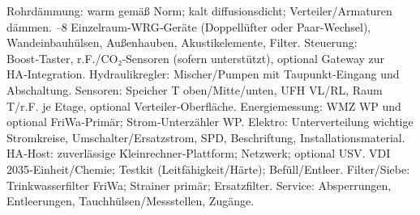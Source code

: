 \markdownRendererUlItem Rohrdämmung: warm gemäß Norm; kalt diffusionsdicht; Verteiler/Armaturen dämmen.\markdownRendererUlItemEnd 
\markdownRendererUlEndTight \markdownRendererInterblockSeparator
{}
\markdownRendererSectionEnd \markdownRendererSectionBegin
{}\markdownRendererInterblockSeparator
{}\markdownRendererUlBeginTight
{}–8 Einzelraum‑WRG‑Geräte (Doppellüfter oder Paar‑Wechsel), Wandeinbauhülsen, Außenhauben, Akustikelemente, Filter.\markdownRendererUlItemEnd 
\markdownRendererUlItem Steuerung: Boost‑Taster, r.F./CO₂‑Sensoren (sofern unterstützt), optional Gateway zur HA‑Integration.\markdownRendererUlItemEnd 
\markdownRendererUlEndTight \markdownRendererInterblockSeparator
{}
\markdownRendererSectionEnd \markdownRendererSectionBegin
{}\markdownRendererInterblockSeparator
{}\markdownRendererUlBeginTight
\markdownRendererUlItem Hydraulikregler: Mischer/Pumpen mit Taupunkt‑Eingang und Abschaltung.\markdownRendererUlItemEnd 
\markdownRendererUlItem Sensoren: Speicher T oben/Mitte/unten, UFH VL/RL, Raum T/r.F. je Etage, optional Verteiler‑Oberfläche.\markdownRendererUlItemEnd 
\markdownRendererUlItem Energiemessung: WMZ WP und optional FriWa‑Primär; Strom‑Unterzähler WP.\markdownRendererUlItemEnd 
\markdownRendererUlItem Elektro: Unterverteilung wichtige Stromkreise, Umschalter/Ersatzstrom, SPD, Beschriftung, Installationsmaterial.\markdownRendererUlItemEnd 
\markdownRendererUlItem HA‑Host: zuverlässige Kleinrechner‑Plattform; Netzwerk; optional USV.\markdownRendererUlItemEnd 
\markdownRendererUlEndTight \markdownRendererInterblockSeparator
{}
\markdownRendererSectionEnd \markdownRendererSectionBegin
{}\markdownRendererInterblockSeparator
{}\markdownRendererUlBeginTight
\markdownRendererUlItem VDI 2035‑Einheit/Chemie; Testkit (Leitfähigkeit/Härte); Befüll/Entleer.\markdownRendererUlItemEnd 
\markdownRendererUlItem Filter/Siebe: Trinkwasserfilter FriWa; Strainer primär; Ersatzfilter.\markdownRendererUlItemEnd 
\markdownRendererUlItem Service: Absperrungen, Entleerungen, Tauchhülsen/Messstellen, Zugänge.\markdownRendererUlItemEnd 
\markdownRendererUlEndTight 
\markdownRendererSectionEnd 
\markdownRendererSectionEnd \markdownRendererDocumentEnd